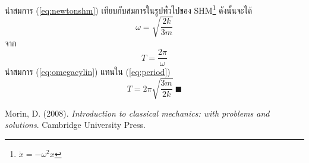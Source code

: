\documentclass[a4paper,12pt]{article}
\begin{document}
นำสมการ (\ref{eq:newtonshm}) เทียบกับสมการในรูปทั่วไปของ SHM\footnote{\(\ddot{x}=-\omega^2x\)} ดังนั้นจะได้
\begin{equation}
	\omega=\sqrt{\frac{2k}{3m}}\label{eq:omegacylin}
\end{equation}
จาก
\begin{equation}
	T=\frac{2\pi}{\omega}\label{eq:period}
\end{equation}
นำสมการ (\ref{eq:omegacylin}) แทนใน (\ref{eq:period})
\begin{equation*}
	T=2\pi\sqrt{\frac{3m}{2k}}\ \blacksquare
\end{equation*}
\begin{thebibliography}{9}
	Morin, D. (2008). \textit{Introduction to classical mechanics: with problems and solutions}. Cambridge University Press.
\end{thebibliography}
\end{document}
